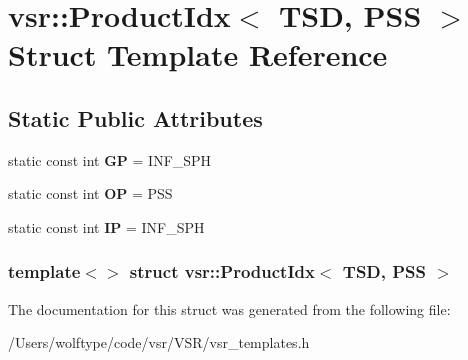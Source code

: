 \hypertarget{structvsr_1_1_product_idx_3_01_t_s_d_00_01_p_s_s_01_4}{\section{vsr\-:\-:Product\-Idx$<$ T\-S\-D, P\-S\-S $>$ Struct Template Reference}
\label{structvsr_1_1_product_idx_3_01_t_s_d_00_01_p_s_s_01_4}
}
\subsection*{Static Public Attributes}
\begin{DoxyCompactItemize}
\item 
\hypertarget{structvsr_1_1_product_idx_3_01_t_s_d_00_01_p_s_s_01_4_a4c91eabf9950cf5578968c3eb72692fa}{static const int {\bfseries G\-P} = I\-N\-F\-\_\-\-S\-P\-H}\label{structvsr_1_1_product_idx_3_01_t_s_d_00_01_p_s_s_01_4_a4c91eabf9950cf5578968c3eb72692fa}

\item 
\hypertarget{structvsr_1_1_product_idx_3_01_t_s_d_00_01_p_s_s_01_4_a5fd982bbf6bebfb6620e712c3734fc6a}{static const int {\bfseries O\-P} = P\-S\-S}\label{structvsr_1_1_product_idx_3_01_t_s_d_00_01_p_s_s_01_4_a5fd982bbf6bebfb6620e712c3734fc6a}

\item 
\hypertarget{structvsr_1_1_product_idx_3_01_t_s_d_00_01_p_s_s_01_4_a7f5bcd234c2a1a17f9384f94ae78eed7}{static const int {\bfseries I\-P} = I\-N\-F\-\_\-\-S\-P\-H}\label{structvsr_1_1_product_idx_3_01_t_s_d_00_01_p_s_s_01_4_a7f5bcd234c2a1a17f9384f94ae78eed7}

\end{DoxyCompactItemize}
\subsubsection*{template$<$$>$ struct vsr\-::\-Product\-Idx$<$ T\-S\-D, P\-S\-S $>$}



The documentation for this struct was generated from the following file\-:\begin{DoxyCompactItemize}
\item 
/\-Users/wolftype/code/vsr/\-V\-S\-R/vsr\-\_\-templates.\-h\end{DoxyCompactItemize}
